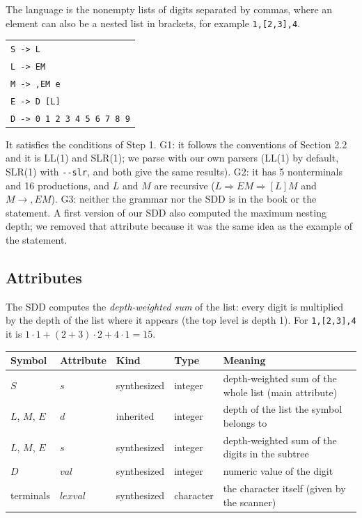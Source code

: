 \documentclass[11pt]{article}
\begin{document}
The language is the nonempty lists of digits separated by commas, where an
element can also be a nested list in brackets, for example
\texttt{1,[2,3],4}.

\begin{center}
\begin{tabular}{l}
\texttt{S -> L} \\
\texttt{L -> EM} \\
\texttt{M -> ,EM e} \\
\texttt{E -> D [L]} \\
\texttt{D -> 0 1 2 3 4 5 6 7 8 9}
\end{tabular}
\end{center}

It satisfies the conditions of Step 1. G1: it follows the conventions of
Section 2.2 and it is LL(1) and SLR(1); we parse with our own parsers (LL(1)
by default, SLR(1) with \texttt{-{}-slr}, and both give the same results).
G2: it has 5 nonterminals and 16 productions, and $L$ and $M$ are recursive
($L \Rightarrow EM \Rightarrow [L]M$ and $M \to ,EM$). G3: neither the grammar
nor the SDD is in the book or the statement. A first version of our SDD also
computed the maximum nesting depth; we removed that attribute because it was
the same idea as the example of the statement.

\subsection{Attributes}

The SDD computes the \emph{depth-weighted sum} of the list: every digit is
multiplied by the depth of the list where it appears (the top level is depth
1). For \texttt{1,[2,3],4} it is $1\cdot1 + (2+3)\cdot2 + 4\cdot1 = 15$.

\begin{center}\small
\begin{tabular}{lllll}
\toprule
Symbol & Attribute & Kind & Type & Meaning \\
\midrule
$S$ & $s$ & synthesized & integer & depth-weighted sum of the whole list (main attribute) \\
$L$, $M$, $E$ & $d$ & inherited & integer & depth of the list the symbol belongs to \\
$L$, $M$, $E$ & $s$ & synthesized & integer & depth-weighted sum of the digits in the subtree \\
$D$ & $val$ & synthesized & integer & numeric value of the digit \\
terminals & $lexval$ & synthesized & character & the character itself (given by the scanner) \\
\bottomrule
\end{tabular}
\end{center}
\end{document}
